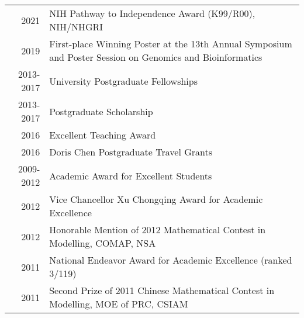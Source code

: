 \begin{longtable}{rX}

2021 &  NIH Pathway to Independence Award (K99/R00), NIH/NHGRI\\

2019 & First-place Winning Poster at the 13th Annual Symposium and Poster Session on Genomics and Bioinformatics\\

2013-2017 & University Postgraduate Fellowships\\

2013-2017 & Postgraduate Scholarship\\

2016 & Excellent Teaching Award\\

2016 & Doris Chen Postgraduate Travel Grants\\

2009-2012 & Academic Award for Excellent Students\\

2012 & Vice Chancellor Xu Chongqing Award for Academic Excellence\\

2012 & Honorable Mention of 2012 Mathematical Contest in Modelling, COMAP, NSA\\

2011 & National Endeavor Award for Academic Excellence (ranked 3/119)\\

2011 & Second Prize of 2011 Chinese Mathematical Contest in Modelling, MOE of PRC, CSIAM\\

\end{longtable}
